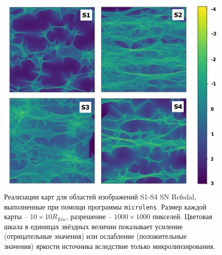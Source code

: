 \begin{figure}[H]
    \centering
	\includegraphics[scale=0.6]{pics/s1s4.png}
	\caption{Реализации карт для областей изображений S1-S4 SN Refsdal, выполненные при помощи программы {\tt{microlens}}. Размер каждой карты -- $10 \times 10 R_{Ein} $, разрешение -- $1000 \times 1000 $ пикселей. Цветовая шкала в единицах звёздных величин показывает усиление (отрицательные значения) или ослабление (положительные значения) яркости источника вследствие только микролинзирования. \label{fig:s1s4}} 
\end{figure}
